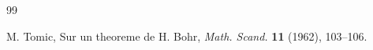 \documentclass[a4paper,12pt]{amsart}
\theoremstyle{definition}
\begin{document}
\begin{thebibliography}{99}
	
	
	
	
	
		 {\sc M. Tomic}, Sur un theoreme de H. Bohr,  {\it Math. Scand.}  {\bf 11} (1962), 103--106.
	
	
	
	
\end{thebibliography}
\end{document}
